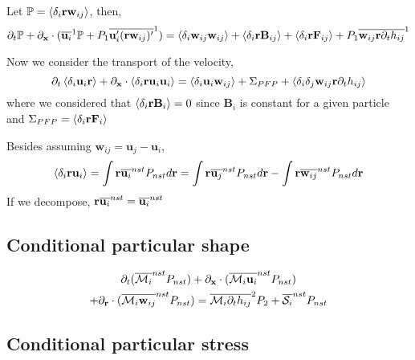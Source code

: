 Let $\mathbb{P} = \left<\delta_i \textbf{rw}_{ij}\right>$, then, 
\begin{equation*}
    \partial_t \mathbb{P} 
  + \partial_\textbf{x} \cdot (\overline{\textbf{u}_i}^{1} \mathbb{P}
  + P_1\overline{\textbf{u}_i' (\textbf{r}\textbf{w}_{ij})'}^{1})
  = \left<\delta_i\textbf{w}_{ij}\textbf{w}_{ij}\right>
  + \left<\delta_i\textbf{r} \textbf{B}_{ij}\right> 
  + \left<\delta_i\textbf{r} \textbf{F}_{ij}\right> 
  + P_1\overline{\textbf{w}_{ij}\textbf{r}\partial_t h_{ij}}^{1}
\end{equation*}

Now we consider the transport of the velocity, 
\begin{equation*}
    \partial_t \left<\delta_i\textbf{u}_{i}\textbf{r}\right> 
  + \partial_\textbf{x} \cdot \left<\delta_i \textbf{r}\textbf{u}_i\textbf{u}_{i}\right>
  = \left<\delta_i\textbf{u}_{i}\textbf{w}_{ij}\right>
  + \Sigma_{PFP}
  + \left<\delta_i\delta_{j}\textbf{w}_{ij}\textbf{r}\partial_t h_{ij} \right>
\end{equation*}
where we considered that $\left<\delta_i\textbf{r} \textbf{B}_{i}\right> = 0 $ since $\textbf{B}_i$ is constant for a given particle and $\Sigma_{PFP} = \left<\delta_i\textbf{r} \textbf{F}_{i}\right>$ 



Besides assuming $\textbf{w}_{ij} = \textbf{u}_j - \textbf{u}_i$, 
\begin{equation}
    \left<\delta_i \textbf{ru}_{i}\right>
    = 
    \int{\textbf{r}\overline{\textbf{u}_{i}}^{nst}} P_{nst}d\textbf{r}
    = \int{\textbf{r}\overline{\textbf{u}_{j}}^{nst}} P_{nst}d\textbf{r}
    - \int{\textbf{r}\overline{\textbf{w}_{ij}}^{nst}} P_{nst}d\textbf{r}
\end{equation}
If we decompose, $\textbf{r}\overline{\textbf{u}_{i}}^{nst} = \overline{\textbf{u}_{i}}^{nst}$
\subsection{Conditional particular shape}
\begin{multline*}
    \partial_t (\overline{\mathcal{M}_{i}}^{nst} P_{nst}) 
    + \partial_\textbf{x} \cdot ( \overline{\mathcal{M}_{i}\textbf{u}_i}^{nst} P_{nst})\\
    + \partial_\textbf{r} \cdot ( \overline{\mathcal{M}_{i}\textbf{w}_{ij}}^{nst} P_{nst}) 
    = 
    \overline{\mathcal{M}_{i}\partial_t h_{ij}}^{2}P_2
    + \overline{\mathcal{S}_i}^{nst}P_{nst}
\end{multline*}
\subsection{Conditional particular stress}

